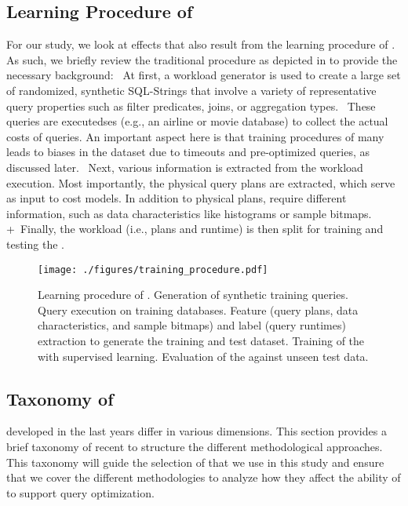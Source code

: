 \subsection{Learning Procedure of \lcms}
For our study, we look at effects that also result from the learning procedure of \lcms.
As such, we briefly review the traditional procedure as depicted in  to provide the necessary background:
~At first, a workload generator is used to create a large set of randomized, synthetic SQL-Strings that involve a variety of representative query properties such as filter predicates, joins, or aggregation types.
~These queries are executedses (e.g., an airline or movie database) to collect the actual costs of queries.
An important aspect here is that training procedures of many \lcms leads to biases in the dataset due to timeouts and pre-optimized queries, as discussed later.
~Next, various information is extracted from the workload execution.
Most importantly, the physical query plans are extracted, which serve as input to cost models.
In addition to physical plans, \lcms require different information, such as data characteristics like histograms or sample bitmaps.
+~Finally, the workload (i.e., plans and runtime) is then split for training and testing the \lcms. 

\begin{figure*}
    \centering
    \texttt{[image: ./figures/training\_procedure.pdf]}
    \caption{
    Learning procedure of \lcms. 
     Generation of synthetic training queries.  Query execution on training databases. 
     Feature (query plans, data characteristics, and sample bitmaps) and label (query runtimes) extraction to generate the training and test dataset. 
     Training of the \lcm with supervised learning. 
     Evaluation of the \lcm against unseen test data.}
    \label{fig:learning_procedure}
\end{figure*}

\subsection{Taxonomy of \lcms} \label{subsec:taxonomy}
\lcms developed in the last years differ in various dimensions.
This section provides a brief taxonomy of recent \lcms to structure the different methodological approaches. 
This taxonomy will guide the selection of \lcms that we use in this study and ensure that we cover the different methodologies to analyze how they affect the ability of \lcms to support query optimization.

